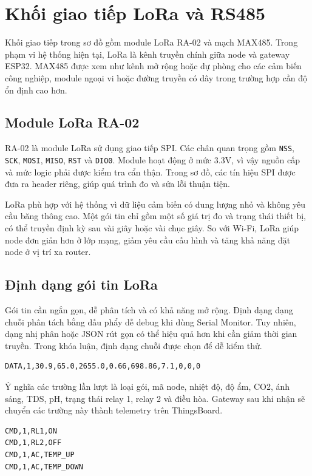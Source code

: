 \section{Khối giao tiếp LoRa và RS485}
Khối giao tiếp trong sơ đồ gồm module LoRa RA-02 và mạch MAX485. Trong phạm vi hệ thống hiện tại, LoRa là kênh truyền chính giữa node và gateway ESP32. MAX485 được xem như kênh mở rộng hoặc dự phòng cho các cảm biến công nghiệp, module ngoại vi hoặc đường truyền có dây trong trường hợp cần độ ổn định cao hơn.

\subsection{Module LoRa RA-02}
RA-02 là module LoRa sử dụng giao tiếp SPI. Các chân quan trọng gồm \texttt{NSS}, \texttt{SCK}, \texttt{MOSI}, \texttt{MISO}, \texttt{RST} và \texttt{DIO0}. Module hoạt động ở mức 3.3V, vì vậy nguồn cấp và mức logic phải được kiểm tra cẩn thận. Trong sơ đồ, các tín hiệu SPI được đưa ra header riêng, giúp quá trình đo và sửa lỗi thuận tiện.

LoRa phù hợp với hệ thống vì dữ liệu cảm biến có dung lượng nhỏ và không yêu cầu băng thông cao. Một gói tin chỉ gồm một số giá trị đo và trạng thái thiết bị, có thể truyền định kỳ sau vài giây hoặc vài chục giây. So với Wi-Fi, LoRa giúp node đơn giản hơn ở lớp mạng, giảm yêu cầu cấu hình và tăng khả năng đặt node ở vị trí xa router.

\subsection{Định dạng gói tin LoRa}
Gói tin cần ngắn gọn, dễ phân tích và có khả năng mở rộng. Định dạng dạng chuỗi phân tách bằng dấu phẩy dễ debug khi dùng Serial Monitor. Tuy nhiên, dạng nhị phân hoặc JSON rút gọn có thể hiệu quả hơn khi cần giảm thời gian truyền. Trong khóa luận, định dạng chuỗi được chọn để dễ kiểm thử.

\begin{lstlisting}[caption={Gói dữ liệu node gửi lên gateway}]
DATA,1,30.9,65.0,2655.0,0.66,698.86,7.1,0,0,0
\end{lstlisting}

Ý nghĩa các trường lần lượt là loại gói, mã node, nhiệt độ, độ ẩm, CO2, ánh sáng, TDS, pH, trạng thái relay 1, relay 2 và điều hòa. Gateway sau khi nhận sẽ chuyển các trường này thành telemetry trên ThingsBoard.

\begin{lstlisting}[caption={Gói lệnh gateway gửi xuống node}]
CMD,1,RL1,ON
CMD,1,RL2,OFF
CMD,1,AC,TEMP_UP
CMD,1,AC,TEMP_DOWN
\end{lstlisting}

